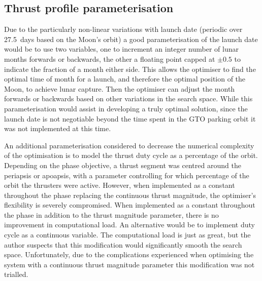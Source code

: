 



\subsection{Thrust profile parameterisation} \label{sub:Thrust-parameterisation}

Due to the particularly non-linear variations with launch date (periodic over 27.5~days based on the Moon's orbit) a good parameterisation of the launch date would be to use two variables, one to increment an integer number of lunar months forwards or backwards, the other a floating point capped at $\pm 0.5$ to indicate the fraction of a month either side. This allows the optimiser to find the optimal time of month for a launch, and therefore the optimal position of the Moon, to achieve lunar capture. Then the optimiser can adjust the month forwards or backwards based on other variations in the search space. While this parameterisation would assist in developing a truly optimal solution, since the launch date is not negotiable beyond the time spent in the GTO parking orbit it was not implemented at this time.

An additional parameterisation considered to decrease the numerical complexity of the optimisation is to model the thrust duty cycle as a percentage of the orbit. Depending on the phase objective, a thrust segment was centred around the periapsis or apoapsis, with a parameter controlling for which percentage of the orbit the thrusters were active. However, when implemented as a constant throughout the phase replacing the continuous thrust magnitude, the optimiser's flexibility is severely compromised. When implemented as a constant throughout the phase in addition to the thrust magnitude parameter, there is no improvement in computational load. An alternative would be to implement duty cycle as a continuous variable. The computational load is just as great, but the author suspects that this modification would significantly smooth the search space. Unfortunately, due to the complications experienced when optimising the system with a continuous thrust magnitude parameter this modification was not trialled.

